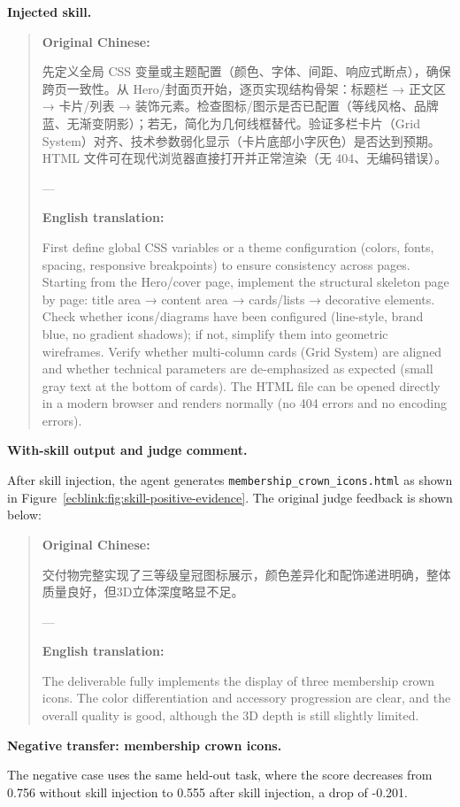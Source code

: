 \documentclass[11pt, a4paper, copyright, frontis]{frontis}
\newcommand{\inlinett}[1]{{\footnotesize\texttt{#1}}}
\newcommand{\caseheader}[1]{\noindent\colorbox{fbcaseblue}{\parbox{0.96\linewidth}{\color{white}\bfseries #1}}\vspace{0.5mm}\newline}
\newenvironment{casebox}{%
  \begin{quote}%
  \setlength{\parindent}{0pt}%
  \setlength{\parskip}{0pt}%
}{%
  \end{quote}%
}
\begin{document}
\caseheader{Injected skill.}
\begin{casebox}\scriptsize\raggedright
\textbf{Original Chinese:}

先定义全局 CSS 变量或主题配置（颜色、字体、间距、响应式断点），确保跨页一致性。从 Hero/封面页开始，逐页实现结构骨架：标题栏 → 正文区 → 卡片/列表 → 装饰元素。检查图标/图示是否已配置（等线风格、品牌蓝、无渐变阴影）；若无，简化为几何线框替代。验证多栏卡片（Grid System）对齐、技术参数弱化显示（卡片底部小字灰色）是否达到预期。HTML 文件可在现代浏览器直接打开并正常渲染（无 404、无编码错误）。

---

\textbf{English translation:}

First define global CSS variables or a theme configuration (colors, fonts, spacing, responsive breakpoints) to ensure consistency across pages. Starting from the Hero/cover page, implement the structural skeleton page by page: title area → content area → cards/lists → decorative elements. Check whether icons/diagrams have been configured (line-style, brand blue, no gradient shadows); if not, simplify them into geometric wireframes. Verify whether multi-column cards (Grid System) are aligned and whether technical parameters are de-emphasized as expected (small gray text at the bottom of cards). The HTML file can be opened directly in a modern browser and renders normally (no 404 errors and no encoding errors).
\end{casebox}

\caseheader{With-skill output and judge comment.}
After skill injection, the agent generates \inlinett{membership\_crown\_icons.html} as shown in Figure~\ref{ecblink:fig:skill-positive-evidence}. The original judge feedback is shown below:
\begin{casebox}\scriptsize\raggedright
\textbf{Original Chinese:}

交付物完整实现了三等级皇冠图标展示，颜色差异化和配饰递进明确，整体质量良好，但3D立体深度略显不足。

---

\textbf{English translation:}

The deliverable fully implements the display of three membership crown icons. The color differentiation and accessory progression are clear, and the overall quality is good, although the 3D depth is still slightly limited.
\end{casebox}

\caseheader{Negative transfer: membership crown icons.}
The negative case uses the same held-out task, where the score decreases from 0.756 without skill injection to 0.555 after skill injection, a drop of -0.201.
\end{document}
